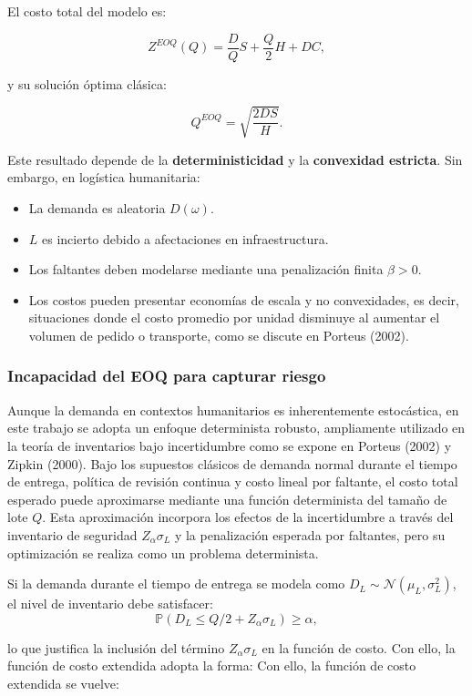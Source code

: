 \documentclass[
  spanish,
  us-letterpaper,
]{scrreprt}
\providecommand{\tightlist}{%
  \setlength{\itemsep}{0pt}\setlength{\parskip}{0pt}}
\numberwithin{equation}{section}
\begin{document}
El costo total del modelo es:

\[
Z^{EOQ}(Q)=\frac{D}{Q}S+\frac{Q}{2}H+DC,
\]

y su solución óptima clásica:

\[
Q^{EOQ}=\sqrt{\frac{2DS}{H}}.
\]

Este resultado depende de la \textbf{deterministicidad} y la
\textbf{convexidad estricta}. Sin embargo, en logística humanitaria:

\begin{itemize}
\tightlist
\item
  La demanda es aleatoria \(D(\omega)\).
\item
  \(L\) es incierto debido a afectaciones en infraestructura.
\item
  Los faltantes deben modelarse mediante una penalización finita
  \(\beta>0\).
\item
  Los costos pueden presentar economías de escala y no convexidades, es
  decir, situaciones donde el costo promedio por unidad disminuye al
  aumentar el volumen de pedido o transporte, como se discute en Porteus
  (2002).
\end{itemize}

\subsubsection{Incapacidad del EOQ para capturar riesgo}\label{sec-ZEOQ}

Aunque la demanda en contextos humanitarios es inherentemente
estocástica, en este trabajo se adopta un enfoque determinista robusto,
ampliamente utilizado en la teoría de inventarios bajo incertidumbre
como se expone en Porteus (2002) y Zipkin (2000). Bajo los supuestos
clásicos de demanda normal durante el tiempo de entrega, política de
revisión continua y costo lineal por faltante, el costo total esperado
puede aproximarse mediante una función determinista del tamaño de lote
\(Q\). Esta aproximación incorpora los efectos de la incertidumbre a
través del inventario de seguridad \(Z_\alpha \sigma_L\) y la
penalización esperada por faltantes, pero su optimización se realiza
como un problema determinista.

Si la demanda durante el tiempo de entrega se modela como
\(D_L \sim \mathcal{N}(\mu_L, \sigma_L^2)\), el nivel de inventario debe
satisfacer: \[
\mathbb{P}(D_L \leq Q/2 + Z_\alpha \sigma_L) \geq \alpha,
\]

lo que justifica la inclusión del término \(Z_\alpha \sigma_L\) en la
función de costo. Con ello, la función de costo extendida adopta la
forma: Con ello, la función de costo extendida se vuelve:
\end{document}
